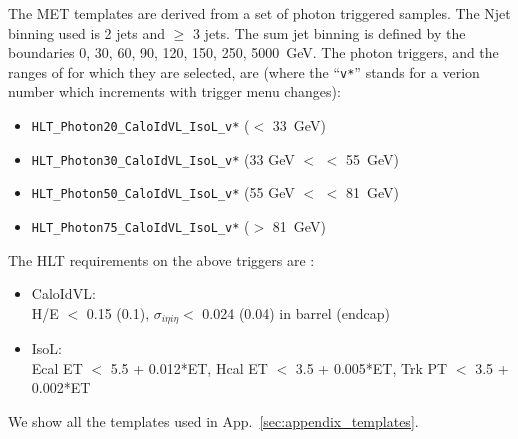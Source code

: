 The MET templates are derived from a set of photon triggered samples. 
The Njet binning used is 2 jets and $\ge$ 3 jets. 
The sum jet \pt binning is defined by the boundaries {0, 30, 60, 90, 120, 150, 250, 5000}~GeV.
The photon triggers, and the ranges of \Z \pt for which they are selected, are (where the ``\verb=v*='' stands for a verion number which increments with trigger menu changes):

\begin{itemize}
\item \verb=HLT_Photon20_CaloIdVL_IsoL_v*= (\Z \pt $<$ 33~GeV)
\item \verb=HLT_Photon30_CaloIdVL_IsoL_v*= (33 GeV $<$ \Z \pt $<$ 55~GeV)
\item \verb=HLT_Photon50_CaloIdVL_IsoL_v*= (55 GeV $<$ \Z \pt $<$ 81~GeV)
\item \verb=HLT_Photon75_CaloIdVL_IsoL_v*= (\Z \pt $>$ 81~GeV)
\end{itemize}

The HLT requirements on the above triggers are \cite{ref:eghlt}:

\begin{itemize}
\item CaloIdVL: \\
  H/E $<$ 0.15 (0.1), $\sigma_{i\eta i\eta} <$ 0.024 (0.04) in barrel (endcap)
\item IsoL: \\
  Ecal ET $<$ 5.5 + 0.012*ET, %
  Hcal ET $<$ 3.5 + 0.005*ET, %
  Trk PT $<$ 3.5 + 0.002*ET 
\end{itemize}




We show all the templates used in App.~\ref{sec:appendix_templates}.


